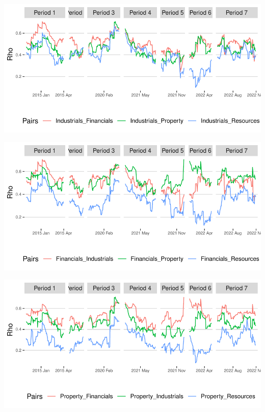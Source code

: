 \documentclass[11pt,preprint, authoryear]{elsarticle}
\let\origfigure\figure
\let\endorigfigure\endfigure
\renewenvironment{figure}[1][2] {
    \expandafter\origfigure\expandafter[H]
} {
    \endorigfigure
}
\numberwithin{equation}{section}
\numberwithin{figure}{section}
\numberwithin{table}{section}
\begin{document}
\begin{figure}[H]

{\centering \includegraphics{Paper_files/figure-latex/DCClsi-1} 

}

\caption{Dynamic Conditional Correlations: Industrials g \label{DCClsi}}\label{fig:DCClsi}
\end{figure}

\begin{figure}[H]

{\centering \includegraphics{Paper_files/figure-latex/DCClsf-1} 

}

\caption{Dynamic Conditional Correlations: Financials \label{DCClsf}}\label{fig:DCClsf}
\end{figure}

\begin{figure}[H]

{\centering \includegraphics{Paper_files/figure-latex/DCClsp-1} 

}

\caption{Dynamic Conditional Correlations: Property  \label{DCClsp}}\label{fig:DCClsp}
\end{figure}
\end{document}
